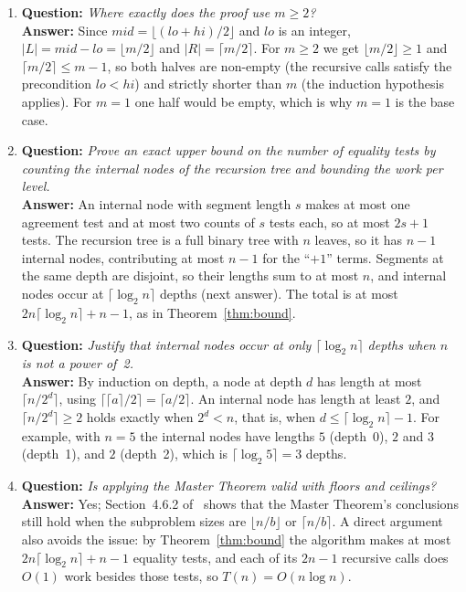 \documentclass[conference]{IEEEtran}
\begin{document}
\begin{enumerate}
\item \textbf{Question:} \emph{Where exactly does the proof use $m \ge 2$?}\\
\textbf{Answer:} Since $mid = \lfloor (lo+hi)/2 \rfloor$ and $lo$ is an
integer, $|L| = mid - lo = \lfloor m/2 \rfloor$ and
$|R| = \lceil m/2 \rceil$. For $m \ge 2$ we get $\lfloor m/2 \rfloor \ge 1$
and $\lceil m/2 \rceil \le m - 1$, so both halves are non-empty (the
recursive calls satisfy the precondition $lo < hi$) and strictly shorter
than $m$ (the induction hypothesis applies). For $m = 1$ one half would be
empty, which is why $m = 1$ is the base case.

\item \textbf{Question:} \emph{Prove an exact upper bound on the number of
equality tests by counting the internal nodes of the recursion tree and
bounding the work per level.}\\
\textbf{Answer:} An internal node with segment length $s$ makes at most one
agreement test and at most two counts of $s$ tests each, so at most $2s + 1$
tests. The recursion tree is a full binary tree with $n$ leaves, so it has
$n - 1$ internal nodes, contributing at most $n - 1$ for the ``$+1$'' terms.
Segments at the same depth are disjoint, so their lengths sum to at most $n$,
and internal nodes occur at $\lceil \log_2 n \rceil$ depths (next answer).
The total is at most $2n\lceil\log_2 n\rceil + n - 1$, as in
Theorem~\ref{thm:bound}.

\item \textbf{Question:} \emph{Justify that internal nodes occur at only
$\lceil \log_2 n \rceil$ depths when $n$ is not a power of~2.}\\
\textbf{Answer:} By induction on depth, a node at depth $d$ has length at
most $\lceil n/2^d \rceil$, using $\lceil \lceil a \rceil / 2 \rceil =
\lceil a/2 \rceil$. An internal node has length at least $2$, and
$\lceil n/2^d \rceil \ge 2$ holds exactly when $2^d < n$, that is, when
$d \le \lceil \log_2 n \rceil - 1$. For example, with $n = 5$ the internal
nodes have lengths $5$ (depth~0), $2$ and $3$ (depth~1), and $2$ (depth~2),
which is $\lceil \log_2 5 \rceil = 3$ depths.

\item \textbf{Question:} \emph{Is applying the Master Theorem valid with
floors and ceilings?}\\
\textbf{Answer:} Yes; Section~4.6.2 of~\cite{cormen2009introduction} shows
that the Master Theorem's conclusions still hold when the subproblem sizes are
$\lfloor n/b \rfloor$ or $\lceil n/b \rceil$. A direct argument also avoids
the issue: by Theorem~\ref{thm:bound} the algorithm makes at most
$2n\lceil\log_2 n\rceil + n - 1$ equality tests, and each of its $2n - 1$
recursive calls does $O(1)$ work besides those tests, so
$T(n) = O(n \log n)$.
\end{enumerate}
\end{document}
